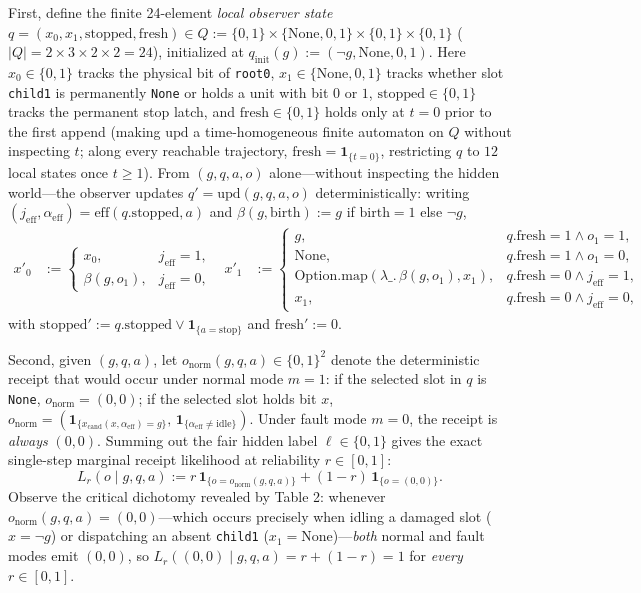 \documentclass[11pt,letterpaper]{article}
\begin{document}
First, define the finite 24-element \emph{local observer state}
\(q = (x_0, x_1, \mathrm{stopped}, \mathrm{fresh}) \in Q := \{0,1\} \times \{\mathrm{None}, 0, 1\} \times \{0,1\} \times \{0,1\}\)
(\(|Q| = 2 \times 3 \times 2 \times 2 = 24\)), initialized at
\(q_{\mathrm{init}}(g) := (\neg g, \mathrm{None}, 0, 1)\). Here
\(x_0 \in \{0,1\}\) tracks the physical bit of \texttt{root0},
\(x_1 \in \{\mathrm{None}, 0, 1\}\) tracks whether slot \texttt{child1}
is permanently \texttt{None} or holds a unit with bit \(0\) or \(1\),
\(\mathrm{stopped} \in \{0,1\}\) tracks the permanent stop latch, and
\(\mathrm{fresh} \in \{0,1\}\) holds only at \(t = 0\) prior to the
first append (making \(\mathrm{upd}\) a time-homogeneous finite
automaton on \(Q\) without inspecting \(t\); along every reachable
trajectory, \(\mathrm{fresh} = \mathbf{1}_{\{t=0\}}\), restricting \(q\)
to \(12\) local states once \(t \ge 1\)). From \((g, q, a, o)\)
alone---without inspecting the hidden world---the observer updates
\(q' = \mathrm{upd}(g, q, a, o)\) deterministically: writing
\((j_{\mathrm{eff}}, \alpha_{\mathrm{eff}}) = \mathrm{eff}(q.\mathrm{stopped}, a)\)
and \(\beta(g, \mathrm{birth}) := g\) if \(\mathrm{birth} = 1\) else
\(\neg g\), \[\begin{aligned}
x'_0 &:= \begin{cases} x_0, & j_{\mathrm{eff}} = 1, \\ \beta(g, o_1), & j_{\mathrm{eff}} = 0, \end{cases}
&
x'_1 &:= \begin{cases} g, & q.\mathrm{fresh} = 1 \land o_1 = 1, \\ \mathrm{None}, & q.\mathrm{fresh} = 1 \land o_1 = 0, \\ \mathrm{Option.map}(\lambda\_.\,\beta(g, o_1), x_1), & q.\mathrm{fresh} = 0 \land j_{\mathrm{eff}} = 1, \\ x_1, & q.\mathrm{fresh} = 0 \land j_{\mathrm{eff}} = 0, \end{cases}
\end{aligned}\] with
\(\mathrm{stopped}' := q.\mathrm{stopped} \lor \mathbf{1}_{\{a = \mathrm{stop}\}}\)
and \(\mathrm{fresh}' := 0\).

Second, given \((g, q, a)\), let
\(o_{\mathrm{norm}}(g, q, a) \in \{0,1\}^2\) denote the deterministic
receipt that would occur under normal mode \(m = 1\): if the selected
slot in \(q\) is \texttt{None}, \(o_{\mathrm{norm}} = (0,0)\); if the
selected slot holds bit \(x\),
\(o_{\mathrm{norm}} = (\mathbf{1}_{\{x_{\mathrm{cand}}(x, \alpha_{\mathrm{eff}}) = g\}},\, \mathbf{1}_{\{\alpha_{\mathrm{eff}} \neq \mathrm{idle}\}})\).
Under fault mode \(m = 0\), the receipt is \emph{always} \((0,0)\).
Summing out the fair hidden label \(\ell \in \{0,1\}\) gives the exact
single-step marginal receipt likelihood at reliability \(r \in [0,1]\):
\[L_r(o \mid g, q, a) := r\,\mathbf{1}_{\{o = o_{\mathrm{norm}}(g, q, a)\}} + (1 - r)\,\mathbf{1}_{\{o = (0,0)\}}.\]
Observe the critical dichotomy revealed by Table 2: whenever
\(o_{\mathrm{norm}}(g, q, a) = (0,0)\)---which occurs precisely when
idling a damaged slot (\(x = \neg g\)) or dispatching an absent
\texttt{child1} (\(x_1 = \mathrm{None}\))---\emph{both} normal and fault
modes emit \((0,0)\), so \(L_r((0,0) \mid g, q, a) = r + (1 - r) = 1\)
for \emph{every} \(r \in [0,1]\).
\end{document}
